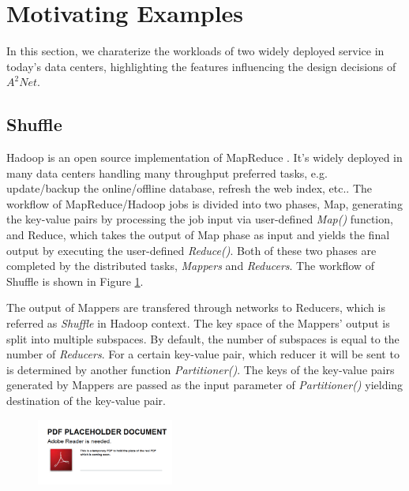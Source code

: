 \section{Motivating Examples}

In this section, we charaterize the workloads of two widely deployed service in today's data centers, highlighting the features influencing the design decisions of $A^2Net$.

\subsection{Shuffle}

Hadoop \cite{Hadoop} is an open source implementation of MapReduce \cite{MapReduce}. It's widely deployed in many data centers handling many throughput preferred tasks, e.g. update/backup the online/offline database, refresh the web index, etc.. The workflow of MapReduce/Hadoop jobs is divided into two phases, Map, generating the key-value pairs by processing the job input via user-defined \emph{Map()} function, and Reduce, which takes the output of Map phase as input and yields the final output by executing the user-defined \emph{Reduce()}. Both of these two phases are completed by the distributed tasks, \emph{Mappers} and \emph{Reducers}. The workflow of Shuffle is shown in Figure \ref{fig:shuffle}.

The output of Mappers are transfered through networks to Reducers, which is referred as \emph{Shuffle} in Hadoop context. The key space of the Mappers' output is split into multiple subspaces. By default, the number of subspaces is equal to the number of \emph{Reducers}. For a certain key-value pair, which reducer it will be sent to is determined by another function \emph{Partitioner()}. The keys of the key-value pairs generated by Mappers are passed as the input parameter of \emph{Partitioner()} yielding destination of the key-value pair.

\begin{figure}
  \centering
  \includegraphics[width=0.4\textwidth]{pic/placeholder}\\
  \caption{}
  \label{fig:shuffle}
\end{figure}

